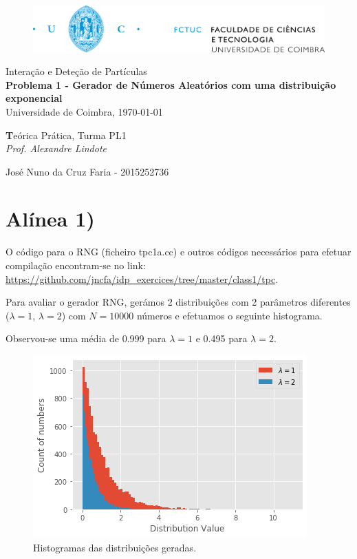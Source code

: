 \documentclass[a4paper, 12pt]{article} %
\def\classtitle{Interação e Deteção de Partículas}
\def\worktitle{Problema 1 - Gerador de Números Aleatórios com uma distribuição exponencial}
\def\profname{Alexandre Lindote}
\def\worklocal{Universidade de Coimbra}
\def\workdate{\today}
\def\authors{
	José Nuno da Cruz Faria - 2015252736
}
\def\classinfo{Teórica Prática, Turma PL1}
\begin{document}
	
	\begin{figure}[t] %
		\centering
		\includegraphics[width=0.85\linewidth]{uc_fctuc}
	\end{figure}

	\vspace*{0.05\textheight}	
	\begin{table}[!htbp]
		\centering
		
		{\Huge \classtitle}\\
		
		\vspace*{0.01\textheight}
		{\Large \textbf{\worktitle}}\\
		
		\vspace*{0.02\textheight}
		{\large {\worklocal, \workdate}}
		
	\end{table}
	
	\begin{table}[H]
		\begin{center}
			{\normalsize %
				\textbf\classinfo\\
				\emph{Prof. \profname}\\ 
				\vspace{0.0035\textheight}			
				\authors 
			}
		\end{center}
	\end{table}

	\section*{Alínea 1)}
	
	O código para o RNG (ficheiro tpc1a.cc) e outros códigos necessários para efetuar compilação encontram-se no link: \url{https://github.com/jncfa/idp_exercices/tree/master/class1/tpc}.

	Para avaliar o gerador RNG, gerámos 2 distribuições com 2 parâmetros diferentes ($\lambda=1$, $\lambda=2$) com $N=10000$ números e efetuamos o seguinte histograma.

	Observou-se uma média de 0.999 para $\lambda=1$ e 0.495 para $\lambda=2$.

	\begin{figure}[H]
		\centering
		\includegraphics[width=0.8\linewidth]{output.png}
		\caption{Histogramas das distribuições geradas.}
	\end{figure}
\end{document}
